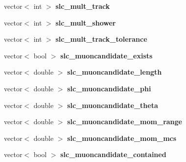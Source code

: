\begin{DoxyCompactItemize}
\item 
\hypertarget{classUBXSecEvent_a2fe1b939fcaf6ffbeb68c8879239c2c0}{vector$<$ int $>$ {\bfseries slc\-\_\-mult\-\_\-track}}\label{classUBXSecEvent_a2fe1b939fcaf6ffbeb68c8879239c2c0}

\item 
\hypertarget{classUBXSecEvent_aaf02413b3f000c45ecaf8aafa9d4e9be}{vector$<$ int $>$ {\bfseries slc\-\_\-mult\-\_\-shower}}\label{classUBXSecEvent_aaf02413b3f000c45ecaf8aafa9d4e9be}

\item 
\hypertarget{classUBXSecEvent_ab49b7199fe07b6ed85017048b685d7bb}{vector$<$ int $>$ {\bfseries slc\-\_\-mult\-\_\-track\-\_\-tolerance}}\label{classUBXSecEvent_ab49b7199fe07b6ed85017048b685d7bb}

\item 
\hypertarget{classUBXSecEvent_a77d7addc1e52f51c7697daab275c8bc6}{vector$<$ bool $>$ {\bfseries slc\-\_\-muoncandidate\-\_\-exists}}\label{classUBXSecEvent_a77d7addc1e52f51c7697daab275c8bc6}

\item 
\hypertarget{classUBXSecEvent_aed08b3fea158e50f1f878bb211e7abb6}{vector$<$ double $>$ {\bfseries slc\-\_\-muoncandidate\-\_\-length}}\label{classUBXSecEvent_aed08b3fea158e50f1f878bb211e7abb6}

\item 
\hypertarget{classUBXSecEvent_a99414e0a0e74aaeac78fa019f53f4760}{vector$<$ double $>$ {\bfseries slc\-\_\-muoncandidate\-\_\-phi}}\label{classUBXSecEvent_a99414e0a0e74aaeac78fa019f53f4760}

\item 
\hypertarget{classUBXSecEvent_a8b3d8a8475d7c283fad2d1d4e6a85dca}{vector$<$ double $>$ {\bfseries slc\-\_\-muoncandidate\-\_\-theta}}\label{classUBXSecEvent_a8b3d8a8475d7c283fad2d1d4e6a85dca}

\item 
\hypertarget{classUBXSecEvent_a80cdc2f0c0eaac347f9475e1e04ca68b}{vector$<$ double $>$ {\bfseries slc\-\_\-muoncandidate\-\_\-mom\-\_\-range}}\label{classUBXSecEvent_a80cdc2f0c0eaac347f9475e1e04ca68b}

\item 
\hypertarget{classUBXSecEvent_abfd994bade285f9f67f74f1a210f5422}{vector$<$ double $>$ {\bfseries slc\-\_\-muoncandidate\-\_\-mom\-\_\-mcs}}\label{classUBXSecEvent_abfd994bade285f9f67f74f1a210f5422}

\item 
\hypertarget{classUBXSecEvent_acece0aff774df48cee7bd4146870c559}{vector$<$ bool $>$ {\bfseries slc\-\_\-muoncandidate\-\_\-contained}}\label{classUBXSecEvent_acece0aff774df48cee7bd4146870c559}


\end{DoxyCompactItemize}
